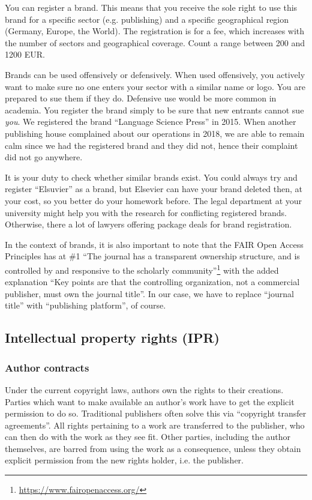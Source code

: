 \documentclass[nonflat,modfonts,output=book] {langsci/langscibook}
\newcommand{\footurl}[1]{\footnote{\url{#1}}}
\begin{document}
You can register a brand. This means that you receive the sole right to use this brand for a specific sector (e.g. publishing) and a specific geographical region (Germany, Europe, the World). The registration is for a fee, which increases with the number of sectors and geographical coverage. Count a range between 200 and 1200 EUR. 

Brands can be used offensively or defensively. When used offensively, you actively want to make sure no one enters your sector with a similar name or logo. You are prepared to sue them if they do. Defensive use would be more common in academia. You register the brand simply to be sure that new entrants cannot sue \textit{you}. We registered the brand ``Language Science Press'' in 2015. When another publishing house complained about our operations in 2018, we are able to remain calm since we had the registered brand and they did not, hence their complaint did not go anywhere.

It is your duty to check whether similar brands exist. You could always try and register ``Elsuvier'' as a brand, but Elsevier can have your brand deleted then, at your cost, so you better do your homework before. The legal department at your university might help you with the research for conflicting registered brands. Otherwise, there a lot of lawyers offering package deals for brand registration. 

In the context of brands, it is also important to note that the FAIR Open Access Principles has at \#1 ``The journal has a transparent ownership structure, and is controlled by and responsive to the scholarly community''\footurl{https://www.fairopenaccess.org/} with the added explanation 
``Key points are that the controlling organization, not a commercial publisher, must own the journal title''. In our case, 
we have to replace ``journal title'' with ``publishing platform'', of course. 
 
\subsection{Intellectual property rights (IPR)}
\subsubsection{Author contracts}\label{sec:authorcontract}
Under the current copyright laws, authors own the rights to their creations. Parties which want to make available an author's work have to get the explicit permission to do so. Traditional publishers often solve this via ``copyright transfer agreements''. All rights pertaining to a work are transferred to the publisher, who can then do with the work as they see fit. Other parties, including the author themselves, are barred from using the work as a consequence, unless they obtain explicit permission from the new rights holder, i.e. the publisher. 
\end{document}
